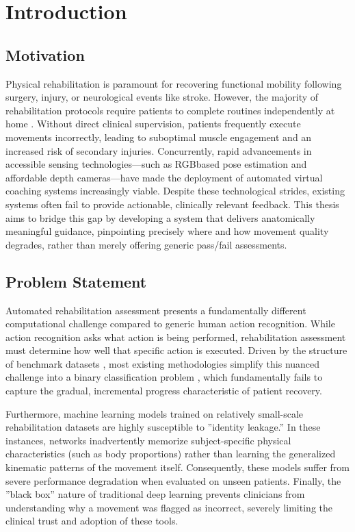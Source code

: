 \chapter{Introduction}
\label{chap:introduction}

\section{Motivation}
\label{sec:intro-motivation}


Physical rehabilitation is paramount for recovering functional mobility following surgery, injury, or neurological events like stroke. However, the majority of rehabilitation protocols require patients to complete routines independently at home \cite{argent2018patient}. Without direct clinical supervision, patients frequently execute movements incorrectly, leading to suboptimal muscle engagement and an increased risk of secondary injuries. Concurrently, rapid advancements in accessible sensing technologies—such as RGBbased pose estimation and affordable depth cameras—have made the deployment of automated virtual coaching systems increasingly viable. Despite these technological strides, existing systems often fail to provide actionable, clinically relevant feedback. This thesis aims to bridge this gap by developing a system that delivers anatomically meaningful guidance, pinpointing precisely where and how movement quality degrades, rather than merely offering generic pass/fail assessments.

\section{Problem Statement}
\label{sec:intro-problem}

Automated rehabilitation assessment presents a fundamentally different computational challenge compared to generic human action recognition. While action recognition asks what action is being performed, rehabilitation assessment must determine how well that specific action is executed.
Driven by the structure of benchmark datasets \cite{VJPB18}, most existing methodologies simplify this nuanced challenge into a binary classification problem \cite{ZGAA25}, which fundamentally fails to capture the gradual, incremental progress characteristic of patient recovery. 

Furthermore, machine learning models trained on relatively small-scale rehabilitation datasets are highly susceptible to ”identity leakage.” In these instances, networks inadvertently memorize subject-specific physical characteristics (such as body proportions) rather than learning the generalized kinematic patterns of the movement itself. Consequently, these models suffer from severe performance degradation when evaluated on unseen patients. Finally, the ”black box” nature of traditional deep learning prevents clinicians from understanding why a movement was flagged as incorrect, severely limiting the clinical trust and adoption of these tools.

